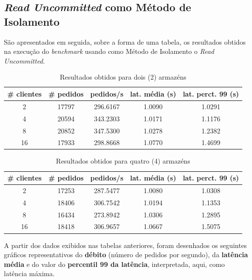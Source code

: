 \subsection{\textit{Read Uncommitted} como Método de Isolamento}

São apresentados em seguida, sobre a forma de uma tabela, os resultados obtidos na execução do \textit{benchmark} usando como Método de Isolamento o \textit{Read Uncommitted}.

\begin{table}[!h]
\center
\small
\begin{tabular}{|c|c|c|c|c|}
\hline
\textbf{\# clientes} & \textbf{\# pedidos} & \textbf{pedidos/s} & \textbf{lat. média (s)} & \textbf{lat. perct. 99 (s)}  \\ \hline
2 & 17797 & 296.6167 & 1.0090 & 1.0291  \\ \hline
4 & 20594 & 343.2303 & 1.0171 & 1.1176  \\ \hline
8 & 20852 & 347.5300 & 1.0278 & 1.2382  \\ \hline
16 & 17933 & 298.8668 & 1.0770 & 1.4699  \\ \hline
\end{tabular}
\caption{Resultados obtidos para dois (2) armazéns}
\end{table}

\begin{table}[!h]
\center
\small
\begin{tabular}{|c|c|c|c|c|}
\hline
\textbf{\# clientes} & \textbf{\# pedidos} & \textbf{pedidos/s} & \textbf{lat. média (s)} & \textbf{lat. perct. 99 (s)}  \\ \hline
2 & 17253 & 287.5477 & 1.0080 & 1.0308  \\ \hline
4 & 18406 & 306.7542 & 1.0194 & 1.1353  \\ \hline
8 & 16434 & 273.8942 & 1.0306 & 1.2895  \\ \hline
16 & 18418 & 306.9657 & 1.0667 & 1.5075  \\ \hline
\end{tabular}
\caption{Resultados obtidos para quatro (4) armazéns}
\end{table}

\newpage

A partir dos dados exibidos nas tabelas anteriores, foram desenhados os seguintes gráficos representativos do \textbf{débito} (número de pedidos por segundo), da \textbf{latência média} e do valor do \textbf{percentil 99 da latência}, interpretada, aqui, como latência máxima.

